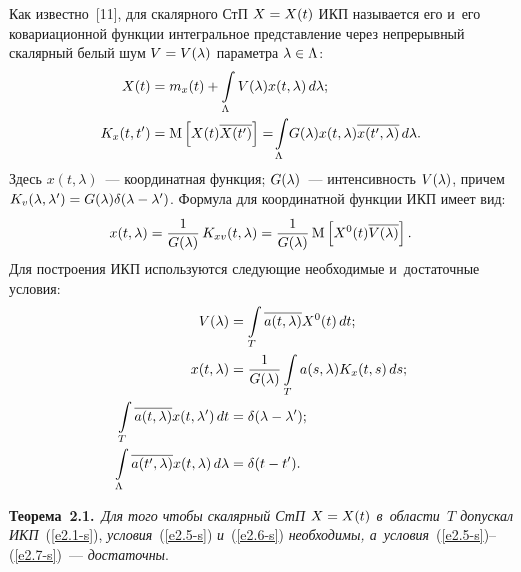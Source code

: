 \begin{multicols}{2}
Как известно~[11], для скалярного СтП $X\hm=X(t)$ ИКП называется его и~его 
ковариационной функции интегральное представление через непрерывный скалярный 
белый шум $V\hm=V(\lambda)$ параметра $\lambda \hm\in \Lambda$:
\begin{align}
X(t) &= m_x (t) + \int\limits_\Lambda V(\la) x (t,\la)\,d\la;
\label{e2.1-s}
\\
K_x (t, t') &=\mathrm{M} \lk X(t) \overline{X(t')}\rk = \!\int\limits_\Lambda \!G (\lambda) x 
(t,\lambda) \overline{x(t',\lambda)} \,d\lambda.\notag %
\end{align}
Здесь  $x(t,\lambda)$~--- координатная функция; $G (\lambda)$~--- интенсивность $V(\lambda)$, 
причем $K_v (\la,\la') \hm= G(\la) \delta (\la\hm-\la')$. Формула для координатной 
функции ИКП имеет вид:
\begin{equation*}
x(t,\lambda) = \displaystyle\frac{\displaystyle 1\mathstrut}{\displaystyle G(\lambda)\mathstrut}\, K_{xv} (t,\lambda) = \displaystyle\frac{\displaystyle 1\mathstrut}{\displaystyle G(\lambda)\mathstrut} \,\mathrm{M} \left[ X^0 
(t) \overline{V(\lambda)}\right].
\end{equation*}
Для построения ИКП используются следующие необходимые и~достаточные условия:
\begin{align}
V(\la) &= \int\limits_T\overline{a(t,\la)} X^0(t) \,dt;\notag %
\\
   x(t,\la)& =  \fr{1}{G(\la)} \int\limits_T a(s,\la)K_x(t,s)\,ds;\label{e2.5-s}\\
   \int\limits_T\overline{a(t,\la)} x(t,\la') \,dt &=\delta (\la-\la');\label{e2.6-s}\\
   \int\limits_\Lambda\overline{a(t',\la)} x(t,\la) \,d\la &=\delta (t-t').\label{e2.7-s}
   \end{align}

\noindent
\textbf{Теорема~2.1.}\ \textit{Для того чтобы скалярный СтП $X\hm=X(t)$ в~области~$T$ допускал ИКП}~(\ref{e2.1-s}), 
\textit{условия}~(\ref{e2.5-s}) \textit{и}~(\ref{e2.6-s}) \textit{необходимы, а~условия}~(\ref{e2.5-s})--(\ref{e2.7-s})~--- \textit{достаточны}.

\smallskip


\end{multicols}

